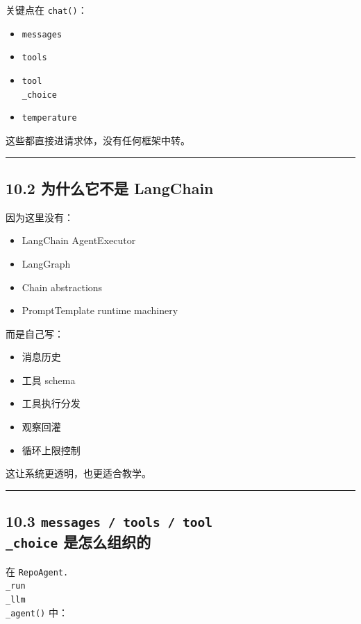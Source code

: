 \documentclass[UTF8,12pt,openany]{ctexbook}
\begin{document}
关键点在 \texttt{chat()}：\par

\begin{itemize}
\item \texttt{messages}
\item \texttt{tools}
\item \texttt{tool\\_choice}
\item \texttt{temperature}
\end{itemize}

这些都直接进请求体，没有任何框架中转。\par

\hrule

\subsection{10.2 为什么它不是 LangChain}

因为这里没有：\par

\begin{itemize}
\item LangChain AgentExecutor
\item LangGraph
\item Chain abstractions
\item PromptTemplate runtime machinery
\end{itemize}

而是自己写：\par

\begin{itemize}
\item 消息历史
\item 工具 schema
\item 工具执行分发
\item 观察回灌
\item 循环上限控制
\end{itemize}

这让系统更透明，也更适合教学。\par

\hrule

\subsection{10.3 \texttt{messages / tools / tool\\_choice} 是怎么组织的}

在 \texttt{RepoAgent.\\_run\\_llm\\_agent()} 中：\par
\end{document}
